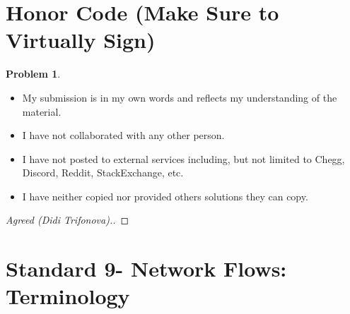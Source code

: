 \documentclass[11pt]{article}
\theoremstyle{definition}
\theoremstyle{definition}
\newtheorem{required}{Problem}
\theoremstyle{definition}
\begin{document}
\section{Honor Code (Make Sure to Virtually Sign)} \label{HonorCode}

\begin{required}
\noindent 
\begin{itemize}
\item My submission is in my own words and reflects my understanding of the material.
\item I have not collaborated with any other person.
\item I have not posted to external services including, but not limited to Chegg, Discord, Reddit, StackExchange, etc.
\item I have neither copied nor provided others solutions they can copy.
\end{itemize}

\end{required}

\begin{proof}[Agreed (Didi Trifonova).]
\end{proof}


\newpage
\section{Standard 9- Network Flows: Terminology}
\end{document}
